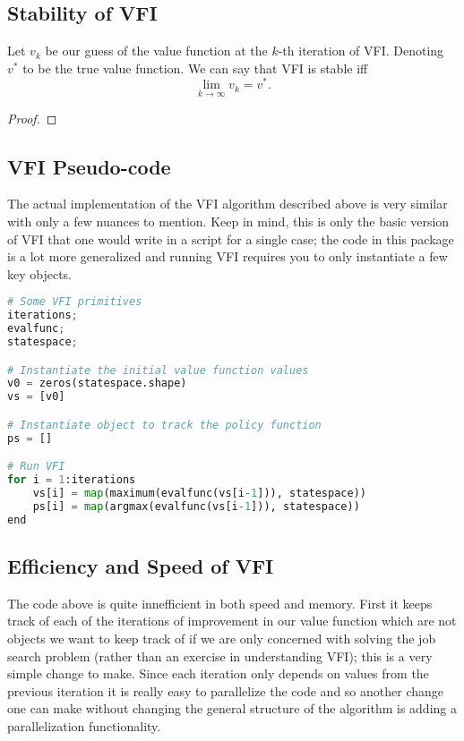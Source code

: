 \documentclass[11pt,english]{article}
\begin{document}
\subsection{Stability of VFI}

Let $v_k$ be our guess of the value function at the $k$-th iteration of VFI. Denoting $v^*$ to be the true value function. We can say that VFI is stable iff $$\lim_{k\to \infty}v_k = v^*.$$
\begin{proof}

\end{proof}



\subsection{VFI Pseudo-code}

The actual implementation of the VFI algorithm described above is very similar with only a few nuances to mention. Keep in mind, this is only the basic version of VFI that one would write in a script for a single case; the code in this package is a lot more generalized and running VFI requires you to only instantiate a few key objects.

\begin{lstlisting}[language = Python]
# Some VFI primitives
iterations;
evalfunc;
statespace;

# Instantiate the initial value function values
v0 = zeros(statespace.shape)
vs = [v0]

# Instantiate object to track the policy function
ps = []

# Run VFI
for i = 1:iterations
	vs[i] = map(maximum(evalfunc(vs[i-1])), statespace))
	ps[i] = map(argmax(evalfunc(vs[i-1])), statespace))
end
\end{lstlisting}

\subsection{Efficiency and Speed of VFI}
The code above is quite innefficient in both speed and memory. First it keeps track of each of the iterations of improvement in our value function which are not objects we want to keep track of if we are only concerned with solving the job search problem (rather than an exercise in understanding VFI); this is a very simple change to make. Since each iteration only depends on values from the previous iteration it is really easy to parallelize the code and so another change one can make without changing the general structure of the algorithm is adding a parallelization functionality.\\
\end{document}
